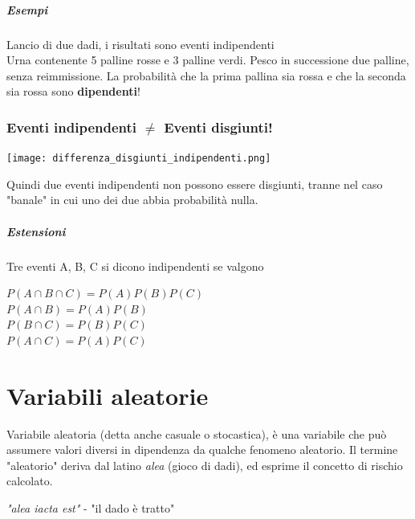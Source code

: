 \documentclass[12pt, a4paper, openany]{book}
\begin{document}
\paragraph{Esempi}
Lancio di due dadi, i risultati sono eventi indipendenti
\\ Urna contenente 5 palline rosse e 3 palline verdi. Pesco in successione due palline, 
senza reimmissione. La probabilità che la prima pallina sia rossa e che la seconda sia rossa
sono \textbf{dipendenti}!

\subsection{Eventi indipendenti $\neq$ Eventi disgiunti!}
\begin{center}
    \texttt{[image: differenza\_disgiunti\_indipendenti.png]}
\end{center}
Quindi due eventi indipendenti non possono essere disgiunti,
tranne nel caso "banale" in cui uno dei due abbia probabilità
nulla.

\paragraph{Estensioni}
Tre eventi A, B, C si dicono indipendenti se valgono
\begin{center}
    $P(A \cap B \cap C) = P(A)P(B)P(C)$
    \\$P(A \cap B) = P(A)P(B)$
    \\$P(B \cap C) = P(B)P(C)$
    \\$P(A \cap C) = P(A)P(C)$
\end{center}

\chapter{Variabili aleatorie}
Variabile aleatoria (detta anche casuale o stocastica), è una variabile che può assumere valori
diversi in dipendenza da qualche fenomeno aleatorio. Il termine "aleatorio" deriva dal latino \textit{alea} (gioco di dadi), ed esprime il
concetto di rischio calcolato.
\begin{center}
    \textit{"alea iacta est"} - "il dado è tratto"
\end{center}
\end{document}
